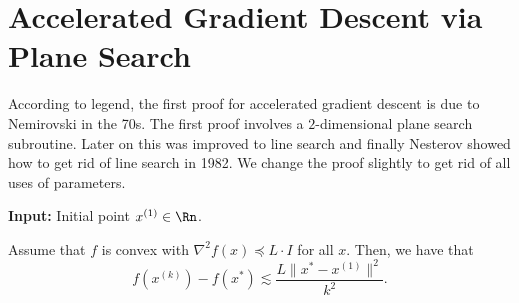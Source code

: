 
\section{Accelerated Gradient Descent via Plane Search}

According to legend, the first proof for accelerated gradient descent
is due to Nemirovski in the 70s. The first proof involves a $2$-dimensional
plane search subroutine. Later on this was improved to line search
and finally Nesterov showed how to get rid of line search in 1982.
We change the proof slightly to get rid of all uses of parameters.

\begin{algorithm2e}[H]

\caption{$\mathtt{NemAGD}$}

\SetAlgoLined

\textbf{Input:} Initial point $x^{(1)}\in\Rn$.


\end{algorithm2e}
\begin{thm}
Assume that $f$ is convex with $\nabla^{2}f(x)\preceq L\cdot I$
for all $x$. Then, we have that 
\[
f(x^{(k)})-f(x^{*})\lesssim\frac{L\|x^{*}-x^{(1)}\|^{2}}{k^{2}}.
\]
\end{thm}

